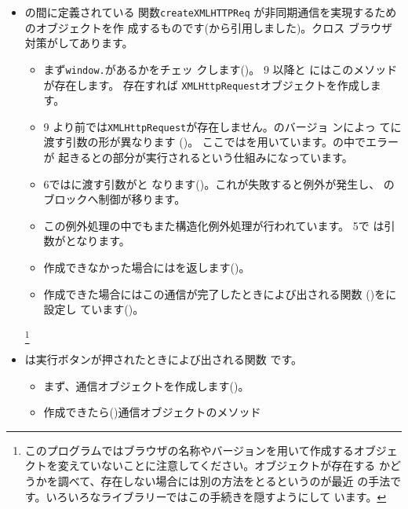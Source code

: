 
\begin{itemize}
 \item {}の間に定義されている
       関数\texttt{createXMLHTTPReq}
       が非同期通信を実現するためのオブジェクトを作
       成するものです(\cite{javascriptHacker}から引用しました)。クロス
       ブラウザ対策がしてあります。
 \begin{itemize}
  \item まず\texttt{window.}があるかをチェッ
	クします()。\IEn{} 9 以降と \Operan にはこのメソッド
	が存在します。
	存在すれば
	\texttt{XMLHttpRequest}オブジェクトを作成します。
  \item \IEn{} 9 より前では\texttt{XMLHttpRequest}が存在しません。\IEn のバージョ
	ンによっ
	てに渡す引数の形が異なります
	()。
	ここではを用いています。の中でエラーが
	起きるとの部分が実行されるという仕組みになっています。
  \item \IEn{} 6ではに渡す引数がと
	なります()。これが失敗すると例外が発生し、
	のブロックへ制御が移ります。
  \item この例外処理の中でもまた構造化例外処理が行われています。\IEn{} 5で
	は引数がとなります。
  \item 作成できなかった場合にはを返します()。
  \item 作成できた場合にはこの通信が完了したときによび出される関数
	()をに設定し
	ています()。
 \end{itemize}
\footnote{このプログラムではブラウザの名称やバージョンを用いて作成するオブジェ
       クトを変えていないことに注意してください。オブジェクトが存在する
       かどうかを調べて、存在しない場合には別の方法をとるというのが最近
       の手法です。いろいろなライブラリーではこの手続きを隠すようにして
       います。}
 \item {}は実行ボタンが押されたときによび出される関数
       です。
\begin{itemize}
 \item まず、通信オブジェクトを作成します()。
 \item 作成できたら()通信オブジェクトのメソッド

\end{itemize}
\end{itemize}
